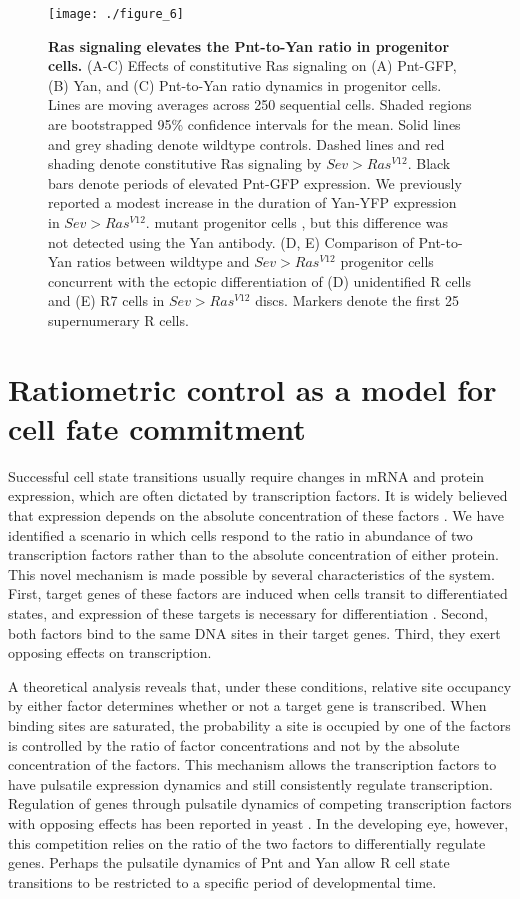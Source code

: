 \begin{figure}[h!]
\centering
\texttt{[image: ./figure\_6]}
\caption[Ras signaling elevates the Pnt-to-Yan ratio in progenitor cells.]{\textbf{Ras signaling elevates the Pnt-to-Yan ratio in progenitor cells.} (A-C) Effects of constitutive Ras signaling on (A) Pnt-GFP, (B) Yan, and (C) Pnt-to-Yan ratio dynamics in progenitor cells. Lines are moving averages across 250 sequential cells. Shaded regions are bootstrapped 95\% confidence intervals for the mean. Solid lines and grey shading denote wildtype controls. Dashed lines and red shading denote constitutive Ras signaling by $Sev>Ras^{V12}$. Black bars denote periods of elevated Pnt-GFP expression. We previously reported a modest increase in the duration of Yan-YFP expression in $Sev>Ras^{V12}$. mutant progenitor cells \cite{Pelaez2015a}, but this difference was not detected using the Yan antibody. (D, E) Comparison of Pnt-to-Yan ratios between wildtype and $Sev>Ras^{V12}$ progenitor cells concurrent with the ectopic differentiation of (D) unidentified R cells and (E) R7 cells in $Sev>Ras^{V12}$ discs. Markers denote the first 25 supernumerary R cells.}
\label{fig:ratio:fig6}
\end{figure}

\section{Ratiometric control as a model for cell fate commitment}

Successful cell state transitions usually require changes in mRNA and protein expression, which are often dictated by transcription factors. It is widely believed that expression depends on the absolute concentration of these factors \cite{Spitz2012}. We have identified a scenario in which cells respond to the ratio in abundance of two transcription factors rather than to the absolute concentration of either protein. This novel mechanism is made possible by several characteristics of the system. First, target genes of these factors are induced when cells transit to differentiated states, and expression of these targets is necessary for differentiation \cite{Xu2000,Nagaraj2002}. Second, both factors bind to the same DNA sites in their target genes. Third, they exert opposing effects on transcription.

A theoretical analysis reveals that, under these conditions, relative site occupancy by either factor determines whether or not a target gene is transcribed. When binding sites are saturated, the probability a site is occupied by one of the factors is controlled by the ratio of factor concentrations and not by the absolute concentration of the factors. This mechanism allows the transcription factors to have pulsatile expression dynamics and still consistently regulate transcription. Regulation of genes through pulsatile dynamics of competing transcription factors with opposing effects has been reported in yeast \cite{Lin2015}. In the developing eye, however, this competition relies on the ratio of the two factors to differentially regulate genes. Perhaps the pulsatile dynamics of Pnt and Yan allow R cell state transitions to be restricted to a specific period of developmental time.

